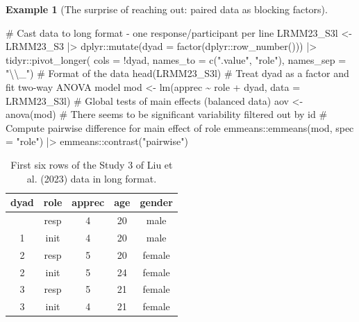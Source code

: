 \documentclass[
  11pt,
  letterpaper,
]{scrbook}
\newenvironment{Shaded}{\begin{snugshade}}{\end{snugshade}}
\newcommand{\AttributeTok}[1]{\textcolor[rgb]{0.40,0.45,0.13}{#1}}
\newcommand{\CommentTok}[1]{\textcolor[rgb]{0.37,0.37,0.37}{#1}}
\newcommand{\FunctionTok}[1]{\textcolor[rgb]{0.28,0.35,0.67}{#1}}
\newcommand{\NormalTok}[1]{\textcolor[rgb]{0.00,0.23,0.31}{#1}}
\newcommand{\OtherTok}[1]{\textcolor[rgb]{0.00,0.23,0.31}{#1}}
\newcommand{\SpecialCharTok}[1]{\textcolor[rgb]{0.37,0.37,0.37}{#1}}
\newcommand{\StringTok}[1]{\textcolor[rgb]{0.13,0.47,0.30}{#1}}
\theoremstyle{definition}
\theoremstyle{definition}
\newtheorem{example}{Example}[chapter]
\theoremstyle{remark}
\begin{document}
\begin{example}[The surprise of reaching out: paired data as blocking
factors]
\begin{Shaded}
\begin{Highlighting}[]
\CommentTok{\# Cast data to long format {-} one response/participant per line}
\NormalTok{LRMM23\_S3l }\OtherTok{\textless{}{-}}\NormalTok{ LRMM23\_S3 }\SpecialCharTok{|\textgreater{}}
\NormalTok{  dplyr}\SpecialCharTok{::}\FunctionTok{mutate}\NormalTok{(}\AttributeTok{dyad =} \FunctionTok{factor}\NormalTok{(dplyr}\SpecialCharTok{::}\FunctionTok{row\_number}\NormalTok{())) }\SpecialCharTok{|\textgreater{}} 
\NormalTok{  tidyr}\SpecialCharTok{::}\FunctionTok{pivot\_longer}\NormalTok{(}
    \AttributeTok{cols =} \SpecialCharTok{!}\NormalTok{dyad, }
    \AttributeTok{names\_to =} \FunctionTok{c}\NormalTok{(}\StringTok{".value"}\NormalTok{, }\StringTok{"role"}\NormalTok{),}
    \AttributeTok{names\_sep =} \StringTok{"}\SpecialCharTok{\textbackslash{}\textbackslash{}}\StringTok{\_"}\NormalTok{)}
\CommentTok{\# Format of the data}
\FunctionTok{head}\NormalTok{(LRMM23\_S3l)}
\CommentTok{\# Treat dyad as a factor and fit two{-}way ANOVA model}
\NormalTok{mod }\OtherTok{\textless{}{-}} \FunctionTok{lm}\NormalTok{(apprec }\SpecialCharTok{\textasciitilde{}}\NormalTok{ role }\SpecialCharTok{+}\NormalTok{ dyad, }\AttributeTok{data =}\NormalTok{ LRMM23\_S3l)}
\CommentTok{\# Global tests of main effects (balanced data)}
\NormalTok{aov }\OtherTok{\textless{}{-}} \FunctionTok{anova}\NormalTok{(mod) }\CommentTok{\# There seems to be significant variability filtered out by \textquotesingle{}id\textquotesingle{}}
\CommentTok{\# Compute pairwise difference for main effect of \textquotesingle{}role\textquotesingle{}}
\NormalTok{emmeans}\SpecialCharTok{::}\FunctionTok{emmeans}\NormalTok{(mod, }\AttributeTok{spec =} \StringTok{"role"}\NormalTok{) }\SpecialCharTok{|\textgreater{}}
\NormalTok{  emmeans}\SpecialCharTok{::}\FunctionTok{contrast}\NormalTok{(}\StringTok{"pairwise"}\NormalTok{)}
\end{Highlighting}
\end{Shaded}

\begin{longtable}[]{@{}ccccc@{}}

\caption{\label{tbl-longdat}First six rows of the Study 3 of Liu et al.
(2023) data in long format.}

\tabularnewline

\toprule\noalign{}
dyad & role & apprec & age & gender \\
\midrule\noalign{}
\endhead
\bottomrule\noalign{}
\endlastfoot
1 & resp & 4 & 20 & male \\
1 & init & 4 & 20 & male \\
2 & resp & 5 & 20 & female \\
2 & init & 5 & 24 & female \\
3 & resp & 5 & 21 & female \\
3 & init & 4 & 21 & female \\


\end{longtable}
\end{example}
\end{document}
